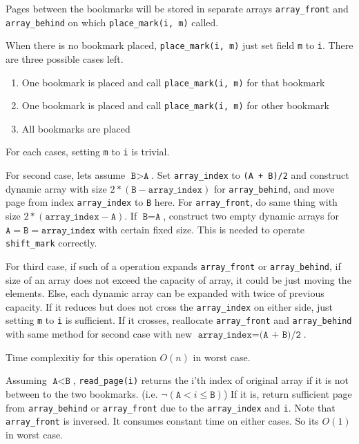 \documentclass[12pt,twoside]{article}
\begin{document}
\begin{problems}
Pages between the bookmarks will be stored in separate arrays
\texttt{array\_front} and \texttt{array\_behind} on which
\texttt{place\_mark(i, m)} called.

When there is no bookmark placed, \texttt{place\_mark(i, m)} just set
field \texttt{m} to \texttt{i}. There are three possible cases left.

\begin{enumerate}
   \item One bookmark is placed and call \texttt{place\_mark(i, m)} for that bookmark
   \item One bookmark is placed and call \texttt{place\_mark(i, m)} for other bookmark
   \item All bookmarks are placed
\end{enumerate}

For each cases, setting \texttt{m} to \texttt{i} is trivial.

For second case, lets assume $\texttt{B} > \texttt{A}$. Set
\texttt{array\_index} to \texttt{(A + B)/2} and construct dynamic
array with size $2 * (\texttt{B} - \texttt{array\_index})$ for
\texttt{array\_behind}, and move page from index \texttt{array\_index}
to \texttt{B} here. For \texttt{array\_front}, do same thing with size
$2 * (\texttt{array\_index} - \texttt{A})$. If
$\texttt{B} = \texttt{A}$, construct two empty dynamic arrays for
$\texttt{A} = \texttt{B} = \texttt{array\_index}$ with certain fixed
size. This is needed to operate \texttt{shift\_mark} correctly.

For third case, if such of a operation expands \texttt{array\_front}
or \texttt{array\_behind}, if size of an array does not exceed the
capacity of array, it could be just moving the elements. Else, each
dynamic array can be expanded with twice of previous capacity. If it
reduces but does not cross the \texttt{array\_index} on either side,
just setting \texttt{m} to \texttt{i} is sufficient. If it crosses,
reallocate \texttt{array\_front} and \texttt{array\_behind} with same
method for second case with new
$\texttt{array\_index} = \texttt{(A + B)/2}$.

Time complexitiy for this operation $O(n)$ in worst case.

Assuming $\texttt{A} < \texttt{B}$, \texttt{read\_page(i)} returns the
i'th index of original array if it is not between to the two
bookmarks.  (i.e. $\neg(\texttt{A} < i \leq\texttt{B})$) If it is,
return sufficient page from \texttt{array\_behind} or
\texttt{array\_front} due to the \texttt{array\_index} and
\texttt{i}. Note that \texttt{array\_front} is inversed. It consumes
constant time on either cases. So its $O(1)$ in worst case.


\end{problems}
\end{document}
